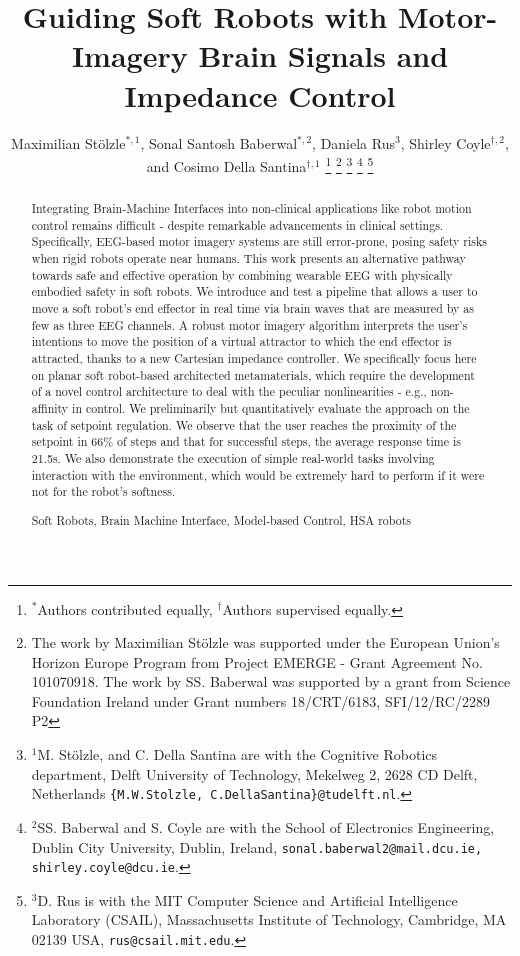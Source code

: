 \documentclass[letterpaper, 10pt, conference]{ieeeconf}      %
\title{\Large \bf
Guiding Soft Robots with Motor-Imagery Brain Signals and Impedance Control
}
\author{Maximilian Stölzle$^{*, 1}$, Sonal Santosh Baberwal$^{*,2}$, Daniela Rus$^{3}$, Shirley Coyle$^{\dagger,2}$, and Cosimo Della Santina$^{\dagger,1}$ %
\thanks{$^*$Authors contributed equally, $^\dagger$Authors supervised equally.}
\thanks{The work by Maximilian Stölzle was supported under the European Union's Horizon Europe Program from Project EMERGE - Grant Agreement No. 101070918. The work by SS. Baberwal was supported by a grant from Science Foundation Ireland under Grant numbers 18/CRT/6183, SFI/12/RC/2289 P2}
\thanks{$^{1}$M. Stölzle, and C. Della Santina are with the Cognitive Robotics department, Delft University of Technology, Mekelweg 2, 2628 CD Delft, Netherlands {\tt\scriptsize \{M.W.Stolzle, C.DellaSantina\}@tudelft.nl}.}
\thanks{
$^{2}$SS. Baberwal and S. Coyle are with the School of Electronics Engineering, Dublin City University, Dublin, Ireland, {\tt\scriptsize sonal.baberwal2@mail.dcu.ie, shirley.coyle@dcu.ie}.}
\thanks{
$^{3}$D. Rus is with the MIT Computer Science and Artificial Intelligence Laboratory (CSAIL), Massachusetts Institute of Technology, Cambridge, MA 02139 USA, {\tt\scriptsize rus@csail.mit.edu}.
}
}
\begin{document}

\maketitle
\thispagestyle{empty}
\pagestyle{empty}

\begin{abstract}
%
Integrating Brain-Machine Interfaces into non-clinical applications like robot motion control remains difficult - despite remarkable advancements in clinical settings. Specifically, EEG-based motor imagery systems are still error-prone, posing safety risks when rigid robots operate near humans. This work presents an alternative pathway towards safe and effective operation by combining wearable EEG with physically embodied safety in soft robots. We introduce and test a pipeline that allows a user to move a soft robot's end effector in real time via brain waves that are measured by as few as three EEG channels. A robust motor imagery algorithm interprets the user's intentions to move the position of a virtual attractor to which the end effector is attracted, thanks to a new Cartesian impedance controller. We specifically focus here on planar soft robot-based architected metamaterials, which require the development of a novel control architecture to deal with the peculiar nonlinearities - e.g., non-affinity in control. We preliminarily but quantitatively evaluate the approach on the task of setpoint regulation. We observe that the user reaches the proximity of the setpoint in 66\% of steps and that for successful steps, the average response time is 21.5s. We also demonstrate the execution of simple real-world tasks involving interaction with the environment, which would be extremely hard to perform if it were not for the robot's softness.

\begin{keywords}
Soft Robots, Brain Machine Interface, Model-based Control, HSA robots
\end{keywords}


\end{abstract}
\end{document}
